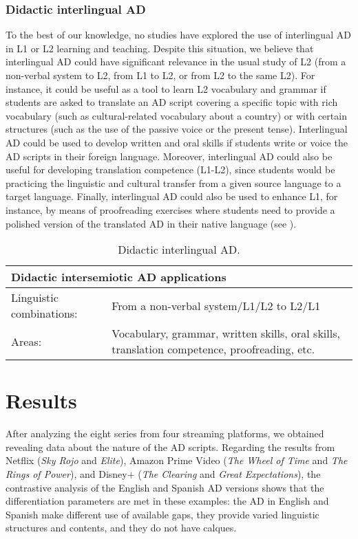 \documentclass[english]{textolivre}
\begin{document}
\subsubsection{Didactic interlingual AD}\label{sec-organizacao-latex}
To the best of our knowledge, no studies have explored the use of interlingual AD in L1 or L2 learning and teaching. Despite this situation, we believe that interlingual AD could have significant relevance in the usual study of L2 (from a non-verbal system to L2, from L1 to L2, or from L2 to the same L2). For instance, it could be useful as a tool to learn L2 vocabulary and grammar if students are asked to translate an AD script covering a specific topic with rich vocabulary (such as cultural-related vocabulary about a country) or with certain structures (such as the use of the passive voice or the present tense). Interlingual AD could be used to develop written and oral skills if students write or voice the AD scripts in their foreign language. Moreover, interlingual AD could also be useful for developing translation competence (L1-L2), since students would be practicing the linguistic and cultural transfer from a given source language to a target language. Finally, interlingual AD could also be used to enhance L1, for instance, by means of proofreading exercises where students need to provide a polished version of the translated AD in their native language (see ).

\begin{table}[htbp]
\centering
\begin{threeparttable}
\caption{Didactic interlingual AD.}
\label{tbl3}
\begin{tabular}{p{4cm} p{10cm}}
\toprule
\multicolumn{2}{l}{Didactic intersemiotic AD applications} \\ 
\midrule
Linguistic combinations: & From a non-verbal system/L1/L2 to L2/L1   \\ 
Areas: & Vocabulary, grammar, written skills, oral skills, translation competence, proofreading, etc.    \\ 
\bottomrule
\end{tabular}
\end{threeparttable}
\end{table}

\section{Results}\label{sec-5}
After analyzing the eight series from four streaming platforms, we obtained revealing data about the nature of the AD scripts. Regarding the results from Netflix (\textit{Sky Rojo} and \textit{Elite}), Amazon Prime Video (\textit{The Wheel of Time} and \textit{The Rings of Power}), and Disney+ (\textit{The Clearing} and \textit{Great Expectations}), the contrastive analysis of the English and Spanish AD versions shows that the differentiation parameters are met in these examples: the AD in English and Spanish make different use of available gaps, they provide varied linguistic structures and contents, and they do not have calques. 
\end{document}
